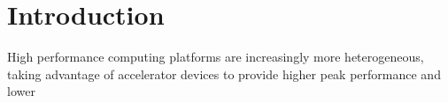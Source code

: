 \documentclass[main.tex]{subfiles}
\begin{document}
\chapter{Introduction}


High performance computing platforms are increasingly more heterogeneous, taking advantage of accelerator devices to provide higher peak performance and lower \cite{compute-efficiency2012}


\end{document}
